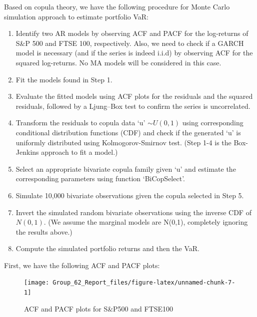 \documentclass[]{article}
\providecommand{\tightlist}{%
  \setlength{\itemsep}{0pt}\setlength{\parskip}{0pt}}
\begin{document}
Based on copula theory, we have the following procedure for Monte Carlo
simulation approach to estimate portfolio VaR:

\begin{enumerate}
\def\labelenumi{\arabic{enumi}.}
\tightlist
\item
  Identify two AR models by observing ACF and PACF for the log-returns
  of S\&P 500 and FTSE 100, respectively. Also, we need to check if a
  GARCH model is necessary (and if the series is indeed i.i.d) by
  observing ACF for the squared log-returns. No MA models will be
  considered in this case.\\
\item
  Fit the models found in Step 1.\\
\item
  Evaluate the fitted models using ACF plots for the residuals and the
  squared residuals, followed by a Ljung--Box test to confirm the series
  is uncorrelated.\\
\item
  Transform the residuals to copula data `u' \(\sim U(0, 1)\) using
  corresponding conditional distribution functions (CDF) and check if
  the generated `u' is uniformly distributed using Kolmogorov-Smirnov
  test. (Step 1-4 is the Box-Jenkins approach to fit a model.)\\
\item
  Select an appropriate bivariate copula family given `u' and estimate
  the corresponding parameters using function `BiCopSelect'.\\
\item
  Simulate 10,000 bivariate observations given the copula selected in
  Step 5.\\
\item
  Invert the simulated random bivariate observations using the inverse
  CDF of \(N(0, 1)\). (We assume the marginal models are N(0,1),
  completely ignoring the results above.)\\
\item
  Compute the simulated portfolio returns and then the VaR.
\end{enumerate}

First, we have the following ACF and PACF plots:

\newpage

\begin{figure}

{\centering \texttt{[image: Group\_62\_Report\_files/figure-latex/unnamed-chunk-7-1]} 

}

\caption{ACF and PACF plots for S\&P500 and FTSE100}\label{fig:unnamed-chunk-7}
\end{figure}
\end{document}
